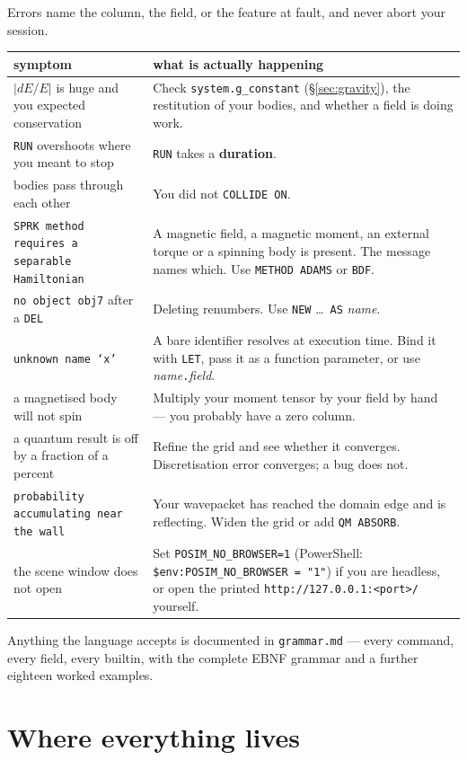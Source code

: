 \documentclass[11pt]{article}
\newcommand{\kw}[1]{\texttt{\uppercase{#1}}}
\newcommand{\code}[1]{\texttt{#1}}
\begin{document}
Errors name the column, the field, or the feature at fault, and never
abort your session.

\begin{center}
\begin{tabular}{p{5.0cm}p{9.6cm}}
\textbf{symptom} & \textbf{what is actually happening}\\\hline
$|dE/E|$ is huge and you expected conservation & Check
\code{system.g\_constant} (\S\ref{sec:gravity}), the restitution of your
bodies, and whether a field is doing work.\\
\kw{run} overshoots where you meant to stop & \kw{run} takes a
\textbf{duration}.\\
bodies pass through each other & You did not \kw{collide on}.\\
\code{SPRK method requires a separable Hamiltonian} & A magnetic field,
a magnetic moment, an external torque or a spinning body is present.
The message names which. Use \kw{method adams} or \kw{bdf}.\\
\code{no object obj7} after a \kw{del} & Deleting renumbers. Use
\kw{new} \dots\ \kw{as} \emph{name}.\\
\code{unknown name `x'} & A bare identifier resolves at execution time.
Bind it with \kw{let}, pass it as a function parameter, or use
\emph{name}\code{.}\emph{field}.\\
a magnetised body will not spin & Multiply your moment tensor by your
field by hand --- you probably have a zero column.\\
a quantum result is off by a fraction of a percent & Refine the grid and
see whether it converges. Discretisation error converges; a bug does
not.\\
\code{probability accumulating near the wall} & Your wavepacket has
reached the domain edge and is reflecting. Widen the grid or add
\kw{qm absorb}.\\
the scene window does not open & Set \code{POSIM\_NO\_BROWSER=1}
(PowerShell: \code{\$env:POSIM\_NO\_BROWSER = "1"}) if you are headless,
or open the printed \code{http://127.0.0.1:<port>/} yourself.\\
\end{tabular}
\end{center}

Anything the language accepts is documented in \code{grammar.md} ---
every command, every field, every builtin, with the complete EBNF
grammar and a further eighteen worked examples.

\section{Where everything lives}
\end{document}
